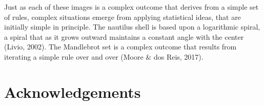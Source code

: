 \documentclass[
  letterpaper,
  DIV=11,
  numbers=noendperiod]{scrreprt}
\begin{document}
Just as each of these images is a complex outcome that derives from a
simple set of rules, complex situations emerge from applying statistical
ideas, that are initially simple in principle. The nautilus shell is
based upon a logarithmic spiral, a spiral that as it grows outward
maintains a constant angle with the center (Livio, 2002). The Mandlebrot
set is a complex outcome that results from iterating a simple rule over
and over (Moore \& dos Reis, 2017).


\chapter*{Acknowledgements}\label{acknowledgements}

\end{document}
